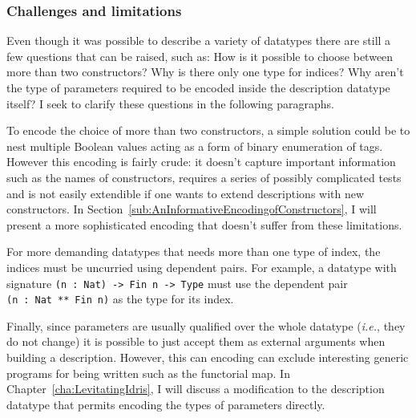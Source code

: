\documentclass{ituthesis}
\newcommand{\tttype}[1]{\textcolor{type-color}{\texttt{#1}}}
\newcommand{\ttvar}[1]{\textcolor{local-var-color}{\texttt{#1}}}
\theoremstyle{definition}
\begin{document}
\subsubsection{Challenges and limitations}
Even though it was possible to describe a variety of datatypes there are still a few questions that can be raised, such as: How is it possible to choose between more than two constructors? Why is there only one type for indices?
Why aren't the type of parameters required to be encoded inside the description datatype itself? I seek to clarify these questions in the following paragraphs.

To encode the choice of more than two constructors, a simple solution could be to nest multiple Boolean values acting as a form of binary enumeration of tags.
However this encoding is fairly crude: it doesn't capture important information such as the names of constructors, requires a series of possibly complicated tests and is not easily extendible if one wants to extend descriptions
with new constructors. In Section~\ref{sub:AnInformativeEncodingofConstructors}, I will present a more sophisticated encoding that doesn't suffer from these limitations.

For more demanding datatypes that needs more than one type of index, the indices must be uncurried using dependent pairs.
For example, a datatype with signature \texttt{(}\ttvar{n}~\texttt{:}~\tttype{Nat}\texttt{)~->~}\tttype{Fin}~\ttvar{n}~\texttt{->}~\tttype{Type} must use the dependent pair \tttype{(}\ttvar{n}~\texttt{:}~\tttype{Nat}~\tttype{**}~\tttype{Fin}~\ttvar{n}\tttype{)} as the type for its index.

Finally, since parameters are usually qualified over the whole datatype (\textit{i.e.}, they do not change) it is possible to just accept them as external arguments when building
a description. However, this can encoding can exclude interesting generic programs for being written such as the functorial map. In Chapter~\ref{cha:LevitatingIdris}, I will discuss a modification to the description datatype that permits encoding the types of
parameters directly.
\end{document}
